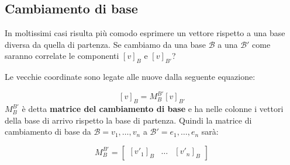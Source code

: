 \documentclass[x11names]{article}
\begin{document}
\subsection{Cambiamento di base}
In moltissimi casi risulta più comodo esprimere un vettore rispetto a una base diversa da quella di partenza. Se cambiamo da una base $\mathscr{B}$ a una $\mathscr{B}'$ come saranno correlate le componenti $\left[v\right]_{B}$ e $\left[v\right]_{B'}$?

\noindent
Le vecchie coordinate sono legate alle nuove dalla seguente equazione:

\[
\left[v\right]_{B} = M_{B}^{B'} \left[v\right]_{B'}
\] 
$M_{B}^{B'}$ è detta  \textbf{matrice del cambiamento di base} e ha nelle colonne i vettori della base di arrivo rispetto la base di partenza. Quindi la matrice di cambiamento di base da $\mathscr{B} = {v_1,\dots,v_{n}}$ a $\mathscr{B}' = {e_{1},\dots,e_{n}}$ sarà:


\[
M_{B}^{B'} =
\left[\begin{array}{c|c|c}
     \left[v'_1\right]_{B}
&  \dots & \left[v'_{n}\right]_{B}
\end{array}
\right]
\] 
\end{document}
